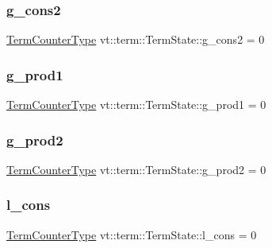 \subsubsection{\texorpdfstring{g\+\_\+cons2}{g\_cons2}}
{\footnotesize\ttfamily \hyperlink{namespacevt_1_1term_a4fd378cdb0c36683afc1b3399d685f7f}{Term\+Counter\+Type} vt\+::term\+::\+Term\+State\+::g\+\_\+cons2 = 0}

\mbox{\label{structvt_1_1term_1_1_term_state_a75ab01f0dcceb86687a3e26edada0620}} 
\subsubsection{\texorpdfstring{g\+\_\+prod1}{g\_prod1}}
{\footnotesize\ttfamily \hyperlink{namespacevt_1_1term_a4fd378cdb0c36683afc1b3399d685f7f}{Term\+Counter\+Type} vt\+::term\+::\+Term\+State\+::g\+\_\+prod1 = 0}

\mbox{\label{structvt_1_1term_1_1_term_state_a5e7029af1dca0645c92f5a00316dc039}} 
\subsubsection{\texorpdfstring{g\+\_\+prod2}{g\_prod2}}
{\footnotesize\ttfamily \hyperlink{namespacevt_1_1term_a4fd378cdb0c36683afc1b3399d685f7f}{Term\+Counter\+Type} vt\+::term\+::\+Term\+State\+::g\+\_\+prod2 = 0}

\mbox{\label{structvt_1_1term_1_1_term_state_a4f44e5ddcb585df5ad215f10bc195d4c}} 
\subsubsection{\texorpdfstring{l\+\_\+cons}{l\_cons}}
{\footnotesize\ttfamily \hyperlink{namespacevt_1_1term_a4fd378cdb0c36683afc1b3399d685f7f}{Term\+Counter\+Type} vt\+::term\+::\+Term\+State\+::l\+\_\+cons = 0}

